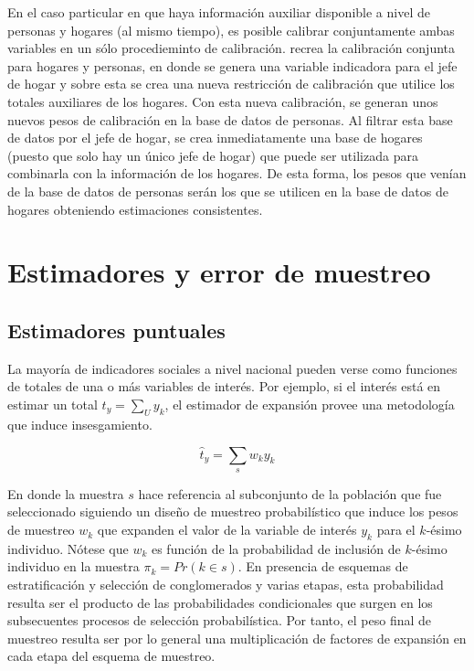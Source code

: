 En el caso particular en que haya información auxiliar disponible a nivel de personas y hogares (al mismo tiempo), es posible calibrar conjuntamente ambas variables en un sólo procedieminto de calibración. \citet[sec.~5]{Estevao_Sarndal_2006} recrea la calibración conjunta para hogares y personas, en donde se genera una variable indicadora para el jefe de hogar y sobre esta se crea una nueva restricción de calibración que utilice los totales auxiliares de los hogares. Con esta nueva calibración, se generan unos nuevos pesos de calibración en la base de datos de personas. Al filtrar esta base de datos por el jefe de hogar, se crea inmediatamente una base de hogares (puesto que solo hay un único jefe de hogar) que puede ser utilizada para combinarla con la información de los hogares. De esta forma, los pesos que venían de la base de datos de personas serán los que se utilicen en la base de datos de hogares obteniendo estimaciones consistentes.

\hypertarget{estimadores-y-error-de-muestreo}{%
\chapter{Estimadores y error de muestreo}\label{estimadores-y-error-de-muestreo}}

\hypertarget{estimadores-puntuales}{%
\section{Estimadores puntuales}\label{estimadores-puntuales}}

La mayoría de indicadores sociales a nivel nacional pueden verse como funciones de totales de una o más variables de interés. Por ejemplo, si el interés está en estimar un total \(t_y=\sum_U y_k\), el estimador de expansión provee una metodología que induce insesgamiento.

\[
\hat{t}_y = \sum_s w_k y_k
\]

En donde la muestra \(s\) hace referencia al subconjunto de la población que fue seleccionado siguiendo un diseño de muestreo probabilístico que induce los pesos de muestreo \(w_k\) que expanden el valor de la variable de interés \(y_k\) para el \(k\)-ésimo individuo. Nótese que \(w_k\) es función de la probabilidad de inclusión de \(k\)-ésimo individuo en la muestra \(\pi_k=Pr(k\in s)\). En presencia de esquemas de estratificación y selección de conglomerados y varias etapas, esta probabilidad resulta ser el producto de las probabilidades condicionales que surgen en los subsecuentes procesos de selección probabilística. Por tanto, el peso final de muestreo resulta ser por lo general una multiplicación de factores de expansión en cada etapa del esquema de muestreo.

